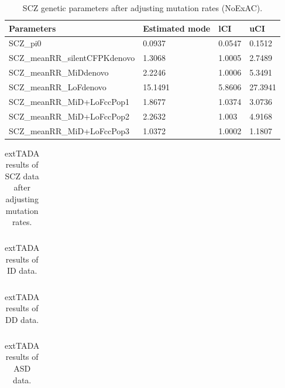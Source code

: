 \documentclass[]{article}
\begin{document}
\begin{table}[H]
\begin{tabular}{|l|l|l|l|}
\hline
Parameters & Estimated mode & lCI & uCI \\
\hline
SCZ\_pi0 & 0.0937 & 0.0547 & 0.1512\\
SCZ\_meanRR\_silentCFPKdenovo & 1.3068 & 1.0005 & 2.7489\\
SCZ\_meanRR\_MiDdenovo & 2.2246 & 1.0006 & 5.3491\\
SCZ\_meanRR\_LoFdenovo & 15.1491 & 5.8606 & 27.3941\\
SCZ\_meanRR\_MiD+LoFccPop1 & 1.8677 & 1.0374 & 3.0736\\
SCZ\_meanRR\_MiD+LoFccPop2 & 2.2632 & 1.003 & 4.9168\\
SCZ\_meanRR\_MiD+LoFccPop3 & 1.0372 & 1.0002 & 1.1807\\
\hline
\end{tabular}
\caption{SCZ genetic parameters after adjusting mutation rates (NoExAC).}
\label{tab:SCZgeneticParametersAdjustMut}
\end{table}

\begin{table}[H]
\begin{tabular}{l}
\end{tabular}
\caption{extTADA results of SCZ data after adjusting mutation rates.}
\label{tab:extTADAforCombinedSCZAdjustMut}
\end{table}




\begin{table}[H]
\begin{tabular}{l}
\end{tabular}
\caption{extTADA results of ID data.}
\label{tab:extTADAforCombinedID}
\end{table}

\begin{table}[H]
\begin{tabular}{l}
\end{tabular}
\caption{extTADA results of DD data.}
\label{tab:extTADAforCombinedDD}
\end{table}

\begin{table}[H]
\begin{tabular}{l}
\end{tabular}
\caption{extTADA results of ASD data.}
\label{tab:extTADAforCombinedASD}
\end{table}
\end{document}
